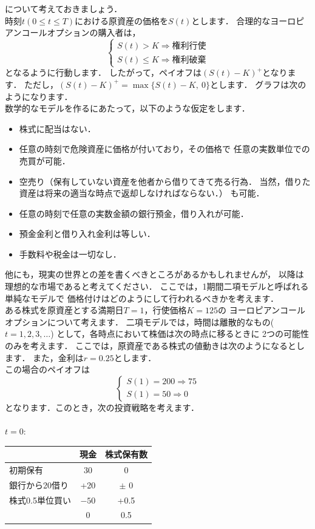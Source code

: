 について考えておきましょう．\\
時刻$t(0\leq t\leq T)$における原資産の価格を$S(t)$とします．
合理的なヨーロピアンコールオプションの購入者は，
\[
\begin{cases}
 S(t)>K\Longrightarrow 権利行使\\
 S(t)\leq K\Longrightarrow 権利破棄
\end{cases}
\]
となるように行動します．
したがって，ペイオフは$(S(t)-K)^+$となります．
ただし，$(S(t)-K)^+=\max\{S(t)-K,\ 0\}$とします．
グラフは次のようになります．
\[

\]
数学的なモデルを作るにあたって，以下のような仮定をします．
\begin{itemize}
 \item 株式に配当はない．
 \item 任意の時刻で危険資産に価格が付いており，その価格で
       任意の実数単位での売買が可能．
 \item 空売り（保有していない資産を他者から借りてきて売る行為．
       当然，借りた資産は将来の適当な時点で返却しなければならない．）
       も可能．
 \item 任意の時刻で任意の実数金額の銀行預金，借り入れが可能．
 \item 預金金利と借り入れ金利は等しい．
 \item 手数料や税金は一切なし．
\end{itemize}
他にも，現実の世界との差を書くべきところがあるかもしれませんが，
以降は理想的な市場であると考えてください．
ここでは，1期間二項モデルと呼ばれる単純なモデルで
価格付けはどのようにして行われるべきかを考えます．
\\
ある株式を原資産とする満期日$T=1$，行使価格$K=125$の
ヨーロピアンコールオプションについて考えます．
二項モデルでは，時間は離散的なもの($t=1,2,3,\ldots$)
として，各時点において株価は次の時点に移るときに
2つの可能性のみを考えます．
ここでは，原資産である株式の値動きは次のようになるとします．
また，金利は$r=0.25$とします．
\[
 
\] 
この場合のペイオフは
\[
 \begin{cases}
  S(1)=200\Longrightarrow 75\\
  S(1)=50\Longrightarrow 0
 \end{cases}
\]
となります．このとき，次の投資戦略を考えます．\\
\\
$t=0$:
\begin{center}
 \begin{tabular}{|l|c|c|}\hline
  & 現金&株式保有数 \\ \hline \hline
  初期保有&30 &0 \\
  銀行から20借り&+20 &$\pm$ 0 \\
  株式0.5単位買い&$-50$ &+0.5 \\ \hline
  &0 &0.5 \\ \hline
 \end{tabular}
\end{center}
